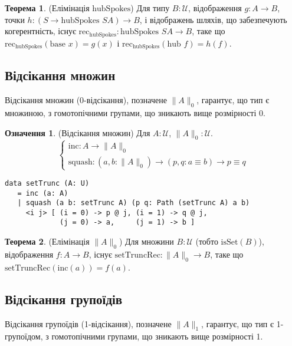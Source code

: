 \documentclass{article}
\theoremstyle{definition}
\newtheorem{theorem}{Теорема}
\newtheorem{definition}{Означення}
\begin{document}
\begin{theorem} (Елімінація \( \text{hubSpokes} \))
Для типу \( B : \mathcal{U} \), відображення \( g : A \to B \),
точки \( h : (S \to \text{hubSpokes } S A) \to B \),
і відображень шляхів, що забезпечують когерентність, існує
\( \text{rec}_{\text{hubSpokes}} : \text{hubSpokes } S A \to B \),
таке що \( \text{rec}_{\text{hubSpokes}}(\text{base } x) = g(x) \)
і \( \text{rec}_{\text{hubSpokes}}(\text{hub } f) = h(f) \).
\end{theorem}

\newpage
\subsection{Відсікання множин}
Відсікання множин (0-відсікання), позначене \( \| A \|_0 \),
гарантує, що тип є множиною, з гомотопічними групами, що зникають вище розмірності 0.

\begin{definition} (Відсікання множин)
Для \( A : \mathcal{U} \), \( \| A \|_0 : \mathcal{U} \).
\[
\begin{cases}
\text{inc} : A \to \| A \|_0 \\
\text{squash} : (a, b : \| A \|_0) \to (p, q : a \equiv b) \to p \equiv q
\end{cases}
\]
\begin{lstlisting}
data setTrunc (A: U)
   = inc (a: A)
   | squash (a b: setTrunc A) (p q: Path (setTrunc A) a b)
     <i j> [ (i = 0) -> p @ j, (i = 1) -> q @ j,
             (j = 0) -> a,     (j = 1) -> b ]
\end{lstlisting}
\end{definition}

\begin{theorem} (Елімінація \( \| A \|_0 \))
Для множини \( B : \mathcal{U} \) (тобто \( \text{isSet}(B) \)), відображення \( f : A \to B \),
існує \( \text{setTruncRec} : \| A \|_0 \to B \), таке що \( \text{setTruncRec}(\text{inc}(a)) = f(a) \).
\end{theorem}

\subsection{Відсікання групоїдів}
Відсікання групоїдів (1-відсікання), позначене \( \| A \|_1 \), гарантує, що
тип є 1-групоїдом, з гомотопічними групами, що зникають вище розмірності 1.
\end{document}
